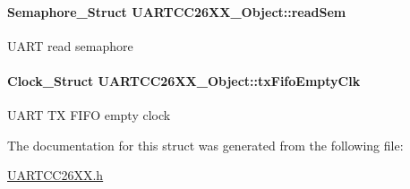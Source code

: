 \paragraph[{read\+Sem}]{\setlength{\rightskip}{0pt plus 5cm}Semaphore\+\_\+\+Struct U\+A\+R\+T\+C\+C26\+X\+X\+\_\+\+Object\+::read\+Sem}\label{struct_u_a_r_t_c_c26_x_x___object_ab81ce13969ecc77d764000ea53fb23d2}
U\+A\+R\+T read semaphore 
\paragraph[{tx\+Fifo\+Empty\+Clk}]{\setlength{\rightskip}{0pt plus 5cm}Clock\+\_\+\+Struct U\+A\+R\+T\+C\+C26\+X\+X\+\_\+\+Object\+::tx\+Fifo\+Empty\+Clk}\label{struct_u_a_r_t_c_c26_x_x___object_a97be7390556f78f9361505c4ee860469}
U\+A\+R\+T T\+X F\+I\+F\+O empty clock 

The documentation for this struct was generated from the following file\+:\begin{DoxyCompactItemize}
\item 
\hyperlink{_u_a_r_t_c_c26_x_x_8h}{U\+A\+R\+T\+C\+C26\+X\+X.\+h}\end{DoxyCompactItemize}
